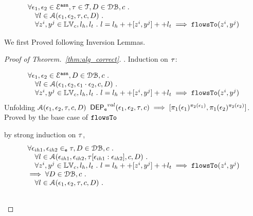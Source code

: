 
\begin{thm}[Correctness]
\label{thm:alg_correct}
\[
\begin{array}{l}
  \forall \mathtt{\epsilon}_1, \mathtt{\epsilon}_2 \in \mathcal{E}^{\mathtt{{asn}}}, \mathtt{\tau} \in \mathcal{T}, D \in \mathcal{DB} , c ~.~
  \\ \quad 
   \forall l \in \mathcal{A}(\mathtt{\epsilon}_1, \mathtt{\epsilon}_2, \mathtt{\tau}, c, D) ~.~
   \\ \quad 
   \forall z^i, y^j \in \mathbb{LV}_c, l_h, l_t ~.~ 
   l = l_h ++ [z^i, y^j] ++ l_t 
   \implies \mathtt{flowsTo}(z^i, y^j)
\end{array}
\]
\end{thm}

We first Proved following Inversion Lemmas.

\clearpage
\begin{proof}[Proof of Theorem.~\ref{thm:alg_correct}].
Induction on $\mathtt{\tau}$:
\begin{case}
[$\trace = \event_1 \cdot \event_2$]
\[
\begin{array}{l}
  \forall \mathtt{\epsilon}_1, \mathtt{\epsilon}_2 \in \mathcal{E}^{\mathtt{{asn}}}, D \in \mathcal{DB} , c ~.~
  \\ \quad 
   \forall l \in \mathcal{A}( \mathtt{\epsilon}_1, \mathtt{\epsilon}_2,  \mathtt{\epsilon}_1 \cdot \mathtt{\epsilon}_2, c, D) ~.~
   \\ \quad 
   \forall z^i, y^j \in \mathbb{LV}_c, l_h, l_t ~.~ 
   l = l_h ++ [z^i, y^j] ++ l_t 
   \implies \mathtt{flowsTo}(z^i, y^j)
\end{array}
\]
%
Unfolding $\mathcal{A}(\mathtt{\epsilon}_1, \mathtt{\epsilon}_2, \mathtt{\tau}, c, D)$
$\mathsf{DEP_{\mathtt{e}}}^{val}(\mathtt{\epsilon}_1, \mathtt{\epsilon}_2, \mathtt{\tau}, c) \implies [\pi_1(\mathtt{\epsilon}_1)^{\pi_2(\mathtt{\epsilon}_1)}, \pi_1(\mathtt{\epsilon}_2)^{\pi_2(\mathtt{\epsilon}_2)}]$.
\\
Proved by the base case of $\mathtt{flowsTo}$
\end{case}
%
\begin{case}
[$\trace = \event_1 \tracecat \trace_{ih} \cdot \event_2$]
by strong induction on $\mathtt{\tau}$,
\[
\begin{array}{l}
  \forall \mathtt{\epsilon}_{ih1}, \mathtt{\epsilon}_{ih2} \in_{\mathtt{e}} \mathtt{\tau}, D \in \mathcal{DB} , c ~.~
  \\ \quad 
   \forall l \in \mathcal{A}(\mathtt{\epsilon}_{ih1}, \mathtt{\epsilon}_{ih2}, \mathtt{\tau}[\mathtt{\epsilon}_{ih1}:\mathtt{\epsilon}_{ih2}], c, D) ~.~
   \\ \quad 
   \forall z^i, y^j \in \mathbb{LV}_c, l_h, l_t ~.~ 
   l = l_h ++ [z^i, y^j] ++ l_t 
   \implies \mathtt{flowsTo}(z^i, y^j)
   \\
   \implies
   \forall D \in \mathcal{DB} , c ~.~
  \\ \quad 
   \forall l \in \mathcal{A}(\mathtt{\epsilon}_1, \mathtt{\epsilon}_2, \mathtt{\tau}, c, D) ~.~
   \\ \quad 

\end{array}\]
\end{case}
\end{proof}
